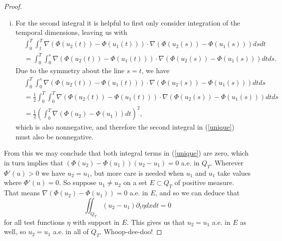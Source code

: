 \documentclass[11pt, a4paper]{article}
\begin{document}
\begin{proof}
\begin{enumerate}[i)]
	\item For the second integral it is helpful to first only consider integration of the temporal dimensions, leaving us with
	\begin{align*}
	&\int_0^T\int_t^T \nabla(\Phi(u_2(t)) - \Phi(u_1(t)))\cdot \nabla(\Phi(u_2(s))-\Phi(u_1(s)))dsdt \\
	&= \int_0^T\int_0^s\nabla(\Phi(u_2(t)) - \Phi(u_1(t)))\cdot \nabla(\Phi(u_2(s))-\Phi(u_1(s)))dtds.
	\end{align*}
	Due to the symmetry about the line $s=t$, we have
	\begin{align*}
	&\int_0^T\int_0^s\nabla(\Phi(u_2(t)) - \Phi(u_1(t)))\cdot \nabla(\Phi(u_2(s))-\Phi(u_1(s)))dtds \\
	&= \frac{1}{2}\int_0^T \int_0^T \nabla(\Phi(u_2(t)) - \Phi(u_1(t)))\cdot \nabla(\Phi(u_2(s))-\Phi(u_1(s)))dtds \\
	&= \frac{1}{2}\left( \int_0^T \nabla(\Phi(u_2)-\Phi(u_1))dt\right)^2,
	\end{align*}
	which is also nonnegative, and therefore the second integral in (\ref{unique}) must also be nonnegative.
\end{enumerate}
From this we may conclude that both integral terms in (\ref{unique}) are zero, which in turn implies that $(\Phi(u_2)-\Phi(u_1))(u_2 - u_1) = 0$ a.e. in $Q_T$. Wherever $\Phi'(u) > 0$ we have $u_2 = u_1$, but more care is needed when $u_1$ and $u_1$ take values where $\Phi'(u) = 0$. So suppose $u_1 \neq u_2$ on a set $E \subset Q_T$ of positive measure. That means $\nabla(\Phi(u_2) - \Phi(u_1)) = 0$ a.e. in $E$, and so we can deduce that 
\begin{equation*}
\iint_{Q_T}(u_2 - u_1)\partial_t \eta dxdt = 0
\end{equation*}
for all test functions $\eta$ with support in $E$. This gives us that $u_2 = u_1$ a.e. in $E$ as well, so $u_2 = u_1$ a.e. in all of $Q_T$. Whoop-dee-doo!
\end{proof}
\end{document}
